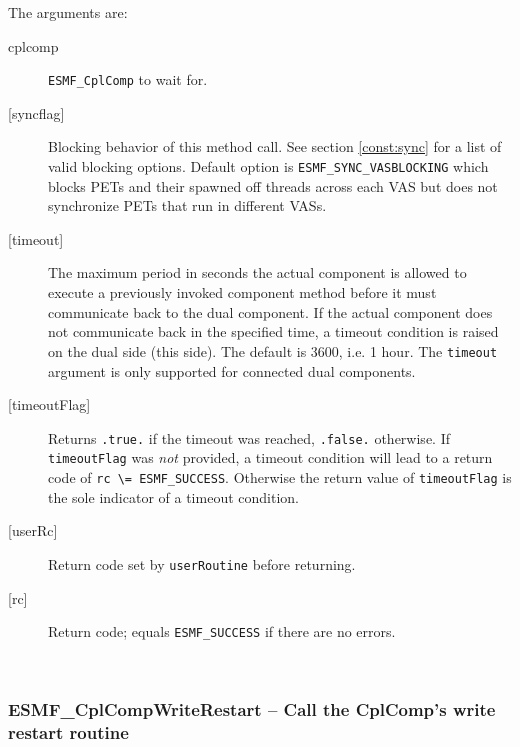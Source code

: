    The arguments are:
   \begin{description}
   \item[cplcomp]
     {\tt ESMF\_CplComp} to wait for.
   \item[{[syncflag]}]
     Blocking behavior of this method call. See section \ref{const:sync}
     for a list of valid blocking options. Default option is
     {\tt ESMF\_SYNC\_VASBLOCKING} which blocks PETs and their spawned off threads
     across each VAS but does not synchronize PETs that run in different VASs.
   \item[{[timeout]}]
     The maximum period in seconds the actual component is allowed to execute
     a previously invoked component method before it must communicate back to
     the dual component. If the actual component does not communicate back in
     the specified time, a timeout condition is raised on the dual side (this
     side). The default is 3600, i.e. 1 hour. The {\tt timeout} argument is only
     supported for connected dual components.
   \item[{[timeoutFlag]}]
     Returns {\tt .true.} if the timeout was reached, {\tt .false.} otherwise.
     If {\tt timeoutFlag} was {\em not} provided, a timeout condition will lead
     to a return code of {\tt rc \textbackslash = ESMF\_SUCCESS}. Otherwise the
     return value of {\tt timeoutFlag} is the sole indicator of a timeout
     condition.
   \item[{[userRc]}]
     Return code set by {\tt userRoutine} before returning.
   \item[{[rc]}]
     Return code; equals {\tt ESMF\_SUCCESS} if there are no errors.
   \end{description}
   
 
\mbox{}\hrulefill\ 
 
\subsubsection [ESMF\_CplCompWriteRestart] {ESMF\_CplCompWriteRestart -- Call the CplComp's write restart routine}


